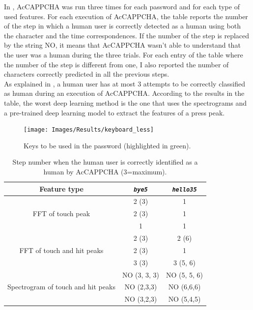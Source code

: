 In , AcCAPPCHA was run three times for each password and for each type of used features. For each execution of AcCAPPCHA, the table reports the number of the step in which a human user is correctly detected as a human using both the character and the time correspondences. If the number of the step is replaced by the string NO, it means that AcCAPPCHA wasn't able to understand that the user was a human during the three trials. For each entry of the table where the number of the step is different from one, I also reported the number of characters correctly predicted in all the previous steps.\\
As explained in , a human user has at most 3 attempts to be correctly classified as human during an execution of AcCAPPCHA. According to the results in the table, the worst deep learning method is the one that uses the spectrograms and a pre-trained deep learning model to extract the features of a press peak.
\begin{figure}[H]
     \centering
	 \texttt{[image: Images/Results/keyboard\_less]}
     \caption{\footnotesize{Keys to be used in the password (highlighted in green).}}\label{Results:keyboard}
\end{figure}
\begin{table}[h]
\centering\footnotesize
\begin{tabular}{ccc}
\hline
{\textbf{Feature type}}&{\texttt{\textit{bye5}}}&{\texttt{\textit{hello35}}}\\
\hline
\multirow{3}{*}{FFT of touch peak} & {2 (3)} & {1}\\
& {2 (3)} & {1}\\
& {1} & {1}\\
\hline
\multirow{3}{*}{FFT of touch and hit peaks} & {2 (3)} & {2 (6)}\\
& {2 (3)} & {1}\\
& {3 (3)} & {3 (5, 6)}\\
\hline
\multirow{3}{*}{Spectrogram of touch and hit peaks} & {NO (3, 3, 3)} & {NO (5, 5, 6)}\\
& {NO (2,3,3)} & {NO (6,6,6)}\\
& {NO (3,2,3)} & {NO (5,4,5)}\\
\hline
\end{tabular}
\caption{\footnotesize{Step number when the human user is correctly identified as a human by AcCAPPCHA (3=maximum).}}
\label{Results:verification}
\end{table}

